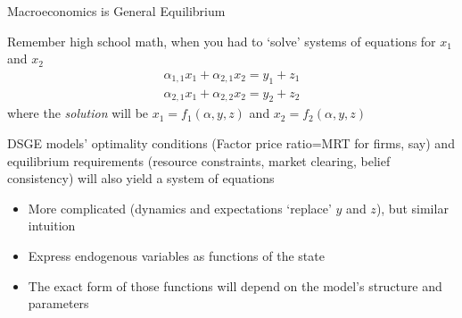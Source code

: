 
\begin{frame}{Macroeconomics is General Equilibrium}

Remember high school math, when you had to `solve' systems of equations for $x_{1}$ and $x_{2}$
\begin{eqnarray*}
\alpha_{1,1}x_{1} + \alpha_{2,1}x_{2}	= y_{1} + z_{1}	\\
\alpha_{2,1}x_{1} + \alpha_{2,2}x_{2}	= y_{2} + z_{2}
\end{eqnarray*}
where the \textit{solution} will be $x_{1}=f_{1}(\alpha,y,z)$ and $x_{2}=f_{2}(\alpha,y,z)$

\vspace{3mm}
DSGE models' optimality conditions (Factor price ratio=MRT for firms, say) and equilibrium requirements (resource constraints, market clearing, belief consistency) will also yield a system of equations
	\begin{itemize}
	\item	More complicated (dynamics and expectations `replace' $y$ and $z$), but similar intuition
	\item	Express endogenous variables as functions of the state
	\item	The exact form of those functions will depend on the model's structure and parameters
	\end{itemize}

\end{frame}


